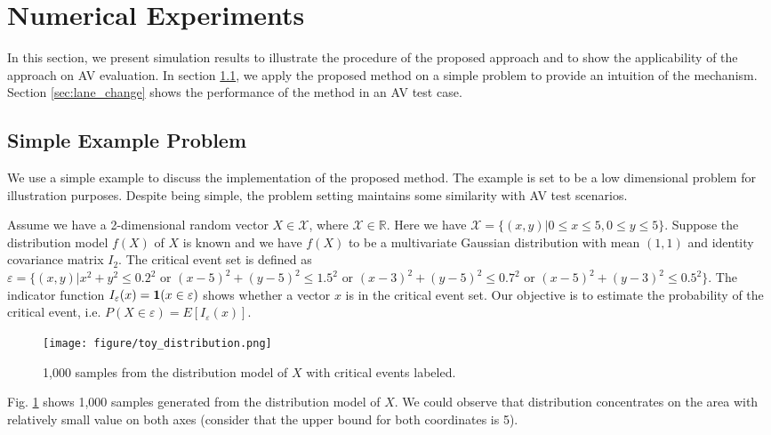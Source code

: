 \documentclass[letterpaper, 10 pt, journal]{IEEEtran}  %
\begin{document}
\section{Numerical Experiments}\label{sec:experiments}
In this section, we present simulation results to illustrate the procedure of the proposed approach and to show the applicability of the approach on AV evaluation. In section \ref{sec:toy}, we apply the proposed method on a simple problem to provide an intuition of the mechanism. Section \ref{sec:lane_change} shows the performance of the method in an AV test case.

\subsection{Simple Example Problem}\label{sec:toy}

We use a simple example to discuss the implementation of the proposed method. The example is set to be a low dimensional problem for illustration purposes. Despite being simple, the problem setting maintains some similarity with AV test scenarios.

Assume we have a 2-dimensional random vector $X\in \mathcal{X}$, where $\mathcal{X}\in \mathbb{R}$. Here we have $\mathcal{X}=\{(x,y)|0\leq x \leq 5,0\leq y \leq 5\}$. Suppose the distribution model $f(X)$ of $X$ is known and we have $f(X)$ to be a multivariate Gaussian distribution with mean $(1,1)$ and identity covariance matrix $I_2$. The critical event set is defined as $\varepsilon  =\{(x,y)| x^2+y^2 \leq 0.2^2  \text{ or } (x-5)^2+(y-5)^2 \leq 1.5^2 \text{ or } (x-3)^2+(y-5)^2 \leq 0.7^2 \text{ or } (x-5)^2+(y-3)^2 \leq 0.5^2 \}$. The indicator function $I_\varepsilon(x)={\bf 1}(x \in \varepsilon)$ shows whether a vector $x$ is in the critical event set. Our objective is to estimate the probability of the critical event, i.e. $P(X \in \varepsilon)=E[I_\varepsilon(x)]$.

\begin{figure}[t]
	\centering
	\texttt{[image: figure/toy\_distribution.png]}
	\caption{1,000 samples from the distribution model of $X$ with critical events labeled.}
	\label{fig:toy_dist}
\end{figure}

Fig. \ref{fig:toy_dist} shows 1,000 samples generated from the distribution model of $X$. We could observe that distribution concentrates on the area with relatively small value on both axes (consider that the upper bound for both coordinates is 5). 
\end{document}

